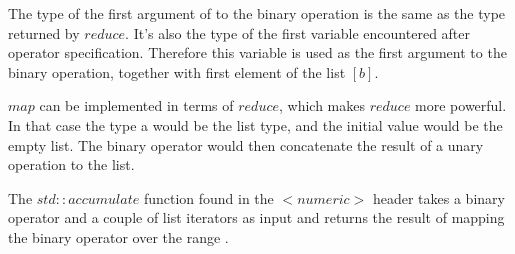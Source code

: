\documentclass[12pt,fleqn]{article}
\begin{document}
The type of the first argument of to the binary operation is the same as the type returned by $reduce$. 
It's also the type of the first variable encountered after operator specification.
Therefore this variable is used as the first argument to the binary operation, together with first element of the list $[b]$.

$map$ can be implemented in terms of $reduce$, which makes $reduce$ more powerful.
In that case the type a would be the list type, and the initial value would be the empty list.
The binary operator would then concatenate the result of a unary operation to the list.

The $std::accumulate$ function found in the $<numeric>$ header takes a binary operator and a couple of list iterators as input and returns the result of mapping the binary operator over the range \cite{josuttis,std::accumulate}.
\end{document}

